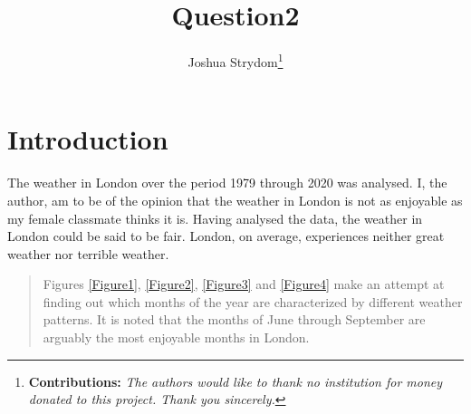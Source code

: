 \documentclass[11pt,preprint, authoryear]{elsarticle}
\numberwithin{equation}{section}
\numberwithin{figure}{section}
\numberwithin{table}{section}
\let\rmarkdownfootnote\footnote%
\def\footnote{\protect\rmarkdownfootnote}
\begin{document}
\begin{frontmatter}  %

\title{Question2}





\author[Add1]{Joshua Strydom\footnote{\textbf{Contributions:}
  \newline \emph{The authors would like to thank no institution for
  money donated to this project. Thank you sincerely.}}}





\address[Add1]{Stellenbosch University, Stellenbosch, South Africa}



\vspace{1cm}





\vspace{0.5cm}

\end{frontmatter}



\pagestyle{fancy}
\chead{}
\rhead{}
\lfoot{}
\lhead{}
\cfoot{}


\headsep 35pt %




\hypertarget{introduction}{%
\section{\texorpdfstring{Introduction
\label{Introduction}}{Introduction }}\label{introduction}}

The weather in London over the period 1979 through 2020 was analysed. I,
the author, am to be of the opinion that the weather in London is not as
enjoyable as my female classmate thinks it is. Having analysed the data,
the weather in London could be said to be fair. London, on average,
experiences neither great weather nor terrible weather.

\begin{quote}
Figures \ref{Figure1}, \ref{Figure2}, \ref{Figure3} and \ref{Figure4}
make an attempt at finding out which months of the year are
characterized by different weather patterns. It is noted that the months
of June through September are arguably the most enjoyable months in
London.
\end{quote}
\end{document}
